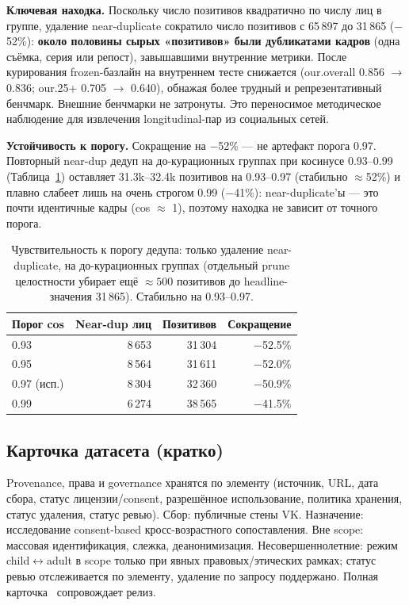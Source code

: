 \documentclass[journal]{IEEEtran}
\begin{document}
\textbf{Ключевая находка.} Поскольку число позитивов квадратично по числу лиц в группе, удаление near-duplicate сократило число позитивов с 65\,897 до 31\,865 ($-$52\%): \textbf{около половины сырых «позитивов» были дубликатами кадров} (одна съёмка, серия или репост), завышавшими внутренние метрики. После курирования frozen-базлайн на внутреннем тесте снижается (our.overall 0.856 $\rightarrow$ 0.836; our.25+ 0.705 $\rightarrow$ 0.640), обнажая более трудный и репрезентативный бенчмарк. Внешние бенчмарки не затронуты. Это переносимое методическое наблюдение для извлечения longitudinal-пар из социальных сетей.

\textbf{Устойчивость к порогу.} Сокращение на $-$52\% --- не артефакт порога 0.97. Повторный near-dup дедуп на до-курационных группах при косинусе 0.93--0.99 (Таблица~\ref{tab:dedupsens}) оставляет 31.3k--32.4k позитивов на 0.93--0.97 (стабильно $\approx$52\%) и плавно слабеет лишь на очень строгом 0.99 ($-$41\%): near-duplicate'ы --- это почти идентичные кадры (cos $\approx$ 1), поэтому находка не зависит от точного порога.

\begin{table}[!t]
\renewcommand{\arraystretch}{1.2}
\caption{Чувствительность к порогу дедупа: только удаление near-duplicate, на до-курационных группах (отдельный prune целостности убирает ещё ${\approx}500$ позитивов до headline-значения 31\,865). Стабильно на 0.93--0.97.}
\label{tab:dedupsens}
\centering
\footnotesize
\begin{tabular}{@{}lrrr@{}}
\toprule
Порог cos & Near-dup лиц & Позитивов & Сокращение \\
\midrule
0.93 & 8\,653 & 31\,304 & $-$52.5\% \\
0.95 & 8\,564 & 31\,611 & $-$52.0\% \\
0.97 (исп.) & 8\,304 & 32\,360 & $-$50.9\% \\
0.99 & 6\,274 & 38\,565 & $-$41.5\% \\
\bottomrule
\end{tabular}
\end{table}

\subsection{Карточка датасета (кратко)}\label{sec:data-datasheet}
Provenance, права и governance хранятся по элементу (источник, URL, дата сбора, статус лицензии/consent, разрешённое использование, политика хранения, статус удаления, статус ревью). Сбор: публичные стены VK. Назначение: исследование consent-based кросс-возрастного сопоставления. Вне scope: массовая идентификация, слежка, деанонимизация. Несовершеннолетние: режим child$\leftrightarrow$adult в scope только при явных правовых/этических рамках; статус ревью отслеживается по элементу, удаление по запросу поддержано. Полная карточка~\cite{gebru2021datasheets} сопровождает релиз.
\end{document}

